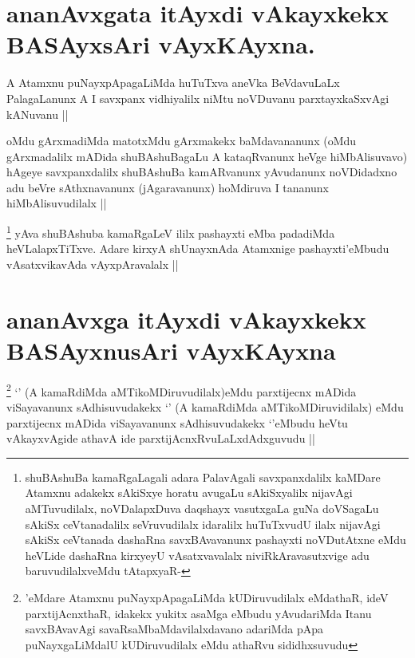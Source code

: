 \section*{ananAvxgata itAyxdi vAkayxkekx BASAyxsAri vAyxKAyxna.}


\begin{artha}
A Atamxnu puNayxpApagaLiMda huTuTxva aneVka BeVdavuLaLx PalagaLanunx A I savxpanx vidhiyalilx niMtu noVDuvanu parxtayxkaSxvAgi kANuvanu ||
\end{artha}


\begin{artha}
oMdu gArxmadiMda matotxMdu gArxmakekx baMdavananunx (oMdu gArxmadalilx mADida shuBAshuBagaLu A kataqRvanunx heVge hiMbAlisuvavo) hAgeye savxpanxdalilx shuBAshuBa kamARvanunx yAvudanunx noVDidadxno adu beVre sAthxnavanunx (jAgaravanunx) hoMdiruva I tananunx hiMbAlisuvudilalx ||
\end{artha}


\begin{artha}
\footnote{shuBAshuBa kamaRgaLagali adara PalavAgali savxpanxdalilx kaMDare Atamxnu adakekx sAkiSxye horatu avugaLu sAkiSxyalilx nijavAgi aMTuvudilalx, noVDalapxDuva daqshayx vasutxgaLa guNa doVSagaLu sAkiSx ceVtanadalilx seVruvudilalx idaralilx huTuTxvudU ilalx nijavAgi sAkiSx ceVtanada dashaRna savxBAvavanunx pashayxti noVDutAtxne eMdu heVLide dashaRna kirxyeyU vAsatxvavalalx niviRkAravasutxvige adu baruvudilalxveMdu tAtapxyaR-}
yAva shuBAshuba kamaRgaLeV ililx pashayxti eMba padadiMda heVLalapxTiTxve. Adare kirxyA shUnayxnAda Atamxnige pashayxti'eMbudu vAsatxvikavAda vAyxpAravalalx ||
\end{artha}

\section*{ananAvxga itAyxdi vAkayxkekx BASAyxnusAri vAyxKAyxna}


\begin{artha}
\footnote{\stext'eMdare Atamxnu puNayxpApagaLiMda kUDiruvudilalx eMdathaR, ideV parxtijAcnxthaR, idakekx yukitx asaMga eMbudu yAvudariMda Itanu savxBAvavAgi savaRsaMbaMdavilalxdavano adariMda pApa puNayxgaLiMdalU kUDiruvudilalx eMdu athaRvu sididhxsuvudu}
`\stext' (A kamaRdiMda aMTikoMDiruvudilalx)eMdu parxtijecnx mADida viSayavanunx sAdhisuvudakekx `\stext' (A kamaRdiMda aMTikoMDiruvidilalx) eMdu parxtijecnx mADida viSayavanunx sAdhisuvudakekx `\stext'eMbudu heVtu vAkayxvAgide athavA ide parxtijAcnxRvuLaLxdAdxguvudu ||
\end{artha}

